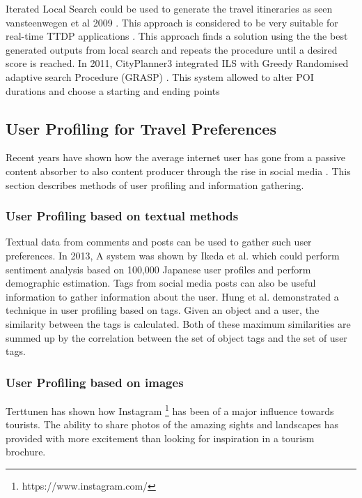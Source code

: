     Iterated Local Search could be used to generate the travel
    itineraries as seen vansteenwegen et al 2009
    \cite{Vansteenwegen2009}. This approach is considered to be very
    suitable for real-time TTDP applications \cite{Gavalas2015}. This
    approach finds a solution using the the best generated outputs
    from local search and repeats the procedure until a desired score
    is reached. In 2011, CityPlanner3 \cite{Vansteenwegen2011a}
    integrated ILS with Greedy Randomised adaptive search Procedure
    (GRASP) \cite{Feo1995}. This system allowed to alter POI durations
    and choose a starting and ending points

\subsection{User Profiling for Travel Preferences}
    Recent years have shown how the average internet user has gone
    from a passive content absorber to also content producer through
    the rise in social media \cite{Ikeda}. This section describes
    methods of user profiling and information gathering.\\

    \subsubsection{User Profiling based on textual methods} Textual
    data from comments and posts can be used to gather such user
    preferences. In 2013, A system was shown by Ikeda et al.
    \cite{Ikeda} which could perform sentiment analysis based on
    100,000 Japanese user profiles and perform demographic estimation.
    Tags from social media posts can also be useful information to
    gather information about the user. Hung et al. \cite{Hung2008}
    demonstrated a technique in user profiling based on tags.  Given
    an object and a user, the similarity between the tags is
    calculated. Both of these maximum similarities are summed up by
    the correlation between the set of object tags and the set of user
    tags. \\

    \subsubsection{User Profiling based on images} Terttunen
    \cite{Terttunen2017} has shown how Instagram
    \footnote{https://www.instagram.com/} has been of a major
    influence towards tourists. The ability to share photos of the
    amazing sights and landscapes has provided with more excitement
    than looking for inspiration in a tourism brochure.

